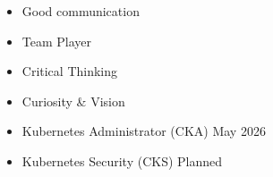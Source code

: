 %
%
%

\threecolumnsection
{
\vspace{-0.8em}
\begin{skills}
\end{skills}}
{
\vspace{0.5em}
\begin{itemize}
	\item Good communication
    \item Team Player
	\item Critical Thinking
    \item Curiosity \& Vision
\end{itemize}
}
{
\vspace{0.5em}
\begin{itemize}
	\item {\faCheckCircle} Kubernetes Administrator (CKA) May 2026
	\item {\faHourglass} Kubernetes Security (CKS) Planned
\end{itemize}
}


